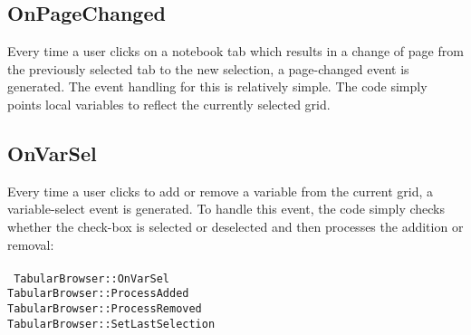 \documentclass[11pt]{article} %
\begin{document}
\subsection{OnPageChanged}
Every time a user clicks on a notebook tab which results in a change of page from the previously selected tab to the new selection, a page-changed event is generated. The event handling for this is relatively simple.  The code simply points local variables to reflect the currently selected grid.

\subsection{OnVarSel}
Every time a user clicks to add or remove a variable from the current grid, a variable-select event is generated.  To handle this event, the code simply checks whether the check-box is selected or deselected and then processes the addition or removal:\\
\\
\texttt{
TabularBrowser::OnVarSel \\
\indent TabularBrowser::ProcessAdded\\
\indent TabularBrowser::ProcessRemoved\\
\indent TabularBrowser::SetLastSelection \\
}
\end{document}

